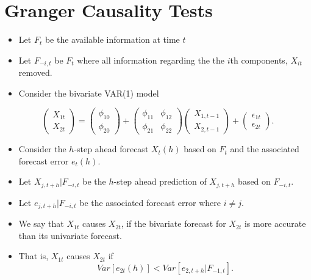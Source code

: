 \documentclass[]{book}
\providecommand{\tightlist}{%
  \setlength{\itemsep}{0pt}\setlength{\parskip}{0pt}}
\begin{document}
\newpage

\hypertarget{granger-causality-tests}{%
\section{Granger Causality Tests}\label{granger-causality-tests}}

\begin{itemize}
\tightlist
\item
  Let \(F_t\) be the available information at time \(t\)
\item
  Let \(F_{-i,t}\) be \(F_t\) where all information regarding the the \(i\)th components, \(X_{it}\) removed.
\item
  Consider the bivariate VAR(1) model
\end{itemize}

\[
 \begin{pmatrix}
  X_{1t} \\ 
   X_{2t} 
\end{pmatrix} =
\begin{pmatrix}
  \phi_{10} \\ 
  \phi_{20} 
\end{pmatrix} +
\begin{pmatrix}
  \phi_{11} &  \phi_{12}\\ 
   \phi_{21} &  \phi_{22}
\end{pmatrix}
 \begin{pmatrix}
  X_{1,t-1} \\ 
   X_{2,t-1} 
\end{pmatrix} +
\begin{pmatrix}
  \epsilon_{1t} \\ 
  \epsilon_{2t} 
\end{pmatrix}.
\]

\begin{itemize}
\tightlist
\item
  Consider the \(h\)-step ahead forecast \(X_t(h)\) based on \(F_t\) and the associated forecast error \(e_t(h)\).
\item
  Let \(X_{j,t+h}|F_{-i,t}\) be the \(h\)-step ahead prediction of \(X_{j,t+h}\) based on \(F_{-i,t}\).
\item
  Let \(e_{j,t+h}|F_{-i,t}\) be the associated forecast error where \(i \neq j.\)
\item
  We say that \(X_{1t}\) causes \(X_{2t}\), if the bivariate forecast for \(X_{2t}\) is more accurate than its univariate forecast.
\item
  That is, \(X_{1t}\) causes \(X_{2t}\) if
  \[Var[e_{2t}(h)]<Var[e_{2,t+h}|F_{-1,t}].\]
\end{itemize}
\end{document}
